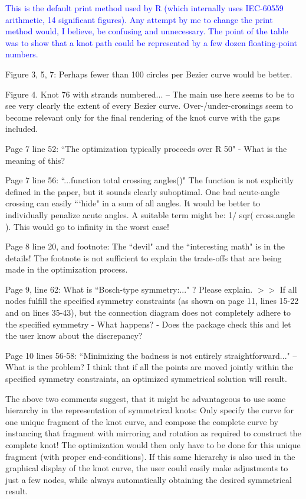 \documentclass[12pt]{article}
\begin{document}
\textcolor{blue}{This is the default print method used by R (which
  internally uses IEC-60559 arithmetic, 14 significant figures).  Any
  attempt by me to change the print method would, I believe, be
  confusing and unnecessary.  The point of the table was to show that
  a knot path could be represented by a few dozen floating-point
  numbers.}

Figure 3, 5, 7: Perhaps fewer than 100 circles per Bezier curve would
be better.


Figure 4.  Knot 76 with strands numbered... -- The main use here seems
to be to see very clearly the extent of every Bezier curve.
Over-/under-crossings seem to become relevant only for the final
rendering of the knot curve with the gaps included.

Page 7 line 52: ``The optimization typically proceeds over R 50" - What
is the meaning of this?

Page 7 line 56: ``...function total crossing angles()" The function is
not explicitly defined in the paper, but it sounds clearly suboptimal.
One bad acute-angle crossing can easily ```hide" in a sum of all angles.
It would be better to individually penalize acute angles.  A suitable
term might be: 1/ sqr( cross.angle ).  This would go to infinity in
the worst case!

Page 8 line 20, and footnote: The ``devil" and the ``interesting math"
is in the details!  The footnote is not sufficient to explain the
trade-offs that are being made in the optimization process.

Page 9, line 62: What is ``Bosch-type symmetry:..." ?  Please explain.
$>>$ If all nodes fulfill the specified symmetry constraints (as shown
on page 11, lines 15-22 and on lines 35-43), but the connection
diagram does not completely adhere to the specified symmetry - What
happens? - Does the package check this and let the user know about the
discrepancy?

Page 10 lines 56-58: ``Minimizing the badness is not entirely
straightforward..."  -- What is the problem?  I think that if all the
points are moved jointly within the specified symmetry constraints, an
optimized symmetrical solution will result.

{The above two comments suggest, that it might be advantageous to use
  some hierarchy in the representation of symmetrical knots: Only
  specify the curve for one unique fragment of the knot curve, and
  compose the complete curve by instancing that fragment with
  mirroring and rotation as required to construct the complete knot!
  The optimization would then only have to be done for this unique
  fragment (with proper end-conditions).  If this same hierarchy is
  also used in the graphical display of the knot curve, the user could
  easily make adjustments to just a few nodes, while always
  automatically obtaining the desired symmetrical result.}
\end{document}
